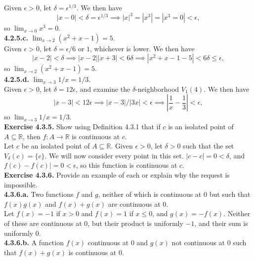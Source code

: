 \documentclass[12pt,letterpaper]{article}
\begin{document}
Given \(\epsilon > 0\), let \(\delta = \epsilon^{1/3}\). We then have \[|x - 0| < \delta = \epsilon^{1/3} \implies |x|^{3} = |x^{3}| = |x^{3} = 0| < \epsilon,\] so \(\lim_{x \to 0} x^{3} = 0\).\\

\textbf{4.2.5.c.} \(\lim_{x \to 2}(x^{2} + x - 1) = 5\). \\

Given \(\epsilon > 0\), let \(\delta = \epsilon/6\) or \(1\), whichever is lower. We then have \[|x-2| < \delta \implies |x-2||x+3| < 6\delta \implies |x^{2} + x -1 - 5| < 6\delta \leq \epsilon,\] so \(\lim_{x \to 2} (x^{2} + x - 1) = 5\). \\

\textbf{4.2.5.d.} \(\lim_{x \to 3} 1/x = 1/3\). \\

Given \(\epsilon > 0\), let \(\delta = 12\epsilon\), and examine the \(\delta\)-neighborhood \(V_{1} (4)\). We then have \[|x - 3| < 12\epsilon \implies |x-3|/|3x| < \epsilon \implies \left|\frac{1}{x} - \frac{1}{3}\right| < \epsilon,\] so \(\lim_{x\to 3} 1/x = 1/3.\) \\

\textbf{Exercise 4.3.5.} Show using Definition 4.3.1 that if \(c\) is an isolated point of \(A \subseteq \mathbb{R}\), then \(f : A \to \mathbb{R}\) is continuous at \(c\). \\

Let \(c\) be an isolated point of \(A \subseteq \mathbb{R}\). Given \(\epsilon > 0\), let \(\delta > 0\) such that the set \(V_{\delta}(c) = \{c\}\). We will now consider every point in this set. \(|c - c| = 0 < \delta\), and \(f(c)- f(c)| = 0 < \epsilon\), so this function is continuous at \(c\). \\

\textbf{Exercise 4.3.6.} Provide an example of each or explain why the request is impossible. \\

\textbf{4.3.6.a.} Two functions \(f\) and \(g\), neither of which is continuous at \(0\) but such that \(f(x)g(x)\) and \(f(x)+g(x)\) are continuous at \(0\). \\

Let \(f(x) = -1\) if \(x > 0\) and \(f(x) = 1\) if \(x \leq 0\), and \(g(x) = -f(x)\). Neither of these are continuous at \(0\), but their product is uniformly \(-1\), and their sum is uniformly \(0\). \\

\textbf{4.3.6.b.} A function \(f(x)\) continuous at \(0\) and \(g(x)\) not continuous at \(0\) such that \(f(x) + g(x)\) is continuous at \(0\). \\
\end{document}
